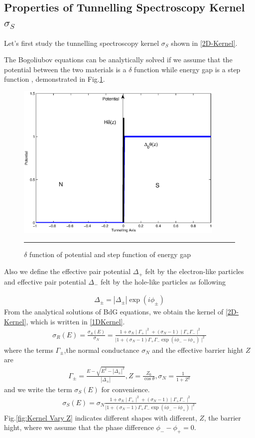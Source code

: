 \subsection{Properties of Tunnelling Spectroscopy Kernel $\sigma_S$}
Let's first study the tunnelling spectroscopy kernel $\sigma_S$ shown in \eqref{2D-Kernel}.

The Bogoliubov equations can be analytically solved if we assume that the potential between the two materials is a $\delta$ function while energy gap is a step function \citep{Reference2}, demonstrated in Fig.\ref{fig:BTK Pair Potential}.
\begin{figure}[htbp]
\small
\centering
\includegraphics[width=10cm]{./Figures/2-2-1.eps}
\rule{35em}{0.5pt}
\caption[An Electron]{$\delta$ function of potential and step function of energy gap}
\label{fig:BTK Pair Potential}
\end{figure}
Also we define the effective pair potential $\Delta_+$ felt by the electron-like particles and effective pair potential $\Delta_-$ felt by the hole-like particles as following

\begin{eqnarray}\label{General Phase Pair}
\Delta_{\pm}=|\Delta_{\pm}|\exp(i\phi_{\pm})
\end{eqnarray}
From the analytical solutions of BdG equations, we obtain the kernel of \eqref{2D-Kernel}, which is written in \eqref{1DKernel}.
\begin{eqnarray}\label{1DKernel}
\sigma_R(E)=\frac{\sigma_S(E)}{\sigma_N}=\frac{1+\sigma_N\mid\Gamma_+\mid^2+(\sigma_N-1)\mid\Gamma_+\Gamma_-\mid^2}{\mid1+(\sigma_N-1)\Gamma_+\Gamma_-\exp(i\phi_--i\phi_+)\mid^2}
\end{eqnarray}
where the terms $\Gamma_{\pm}$,the normal conductance $\sigma_N$ and the effective barrier hight $Z$ are
\begin{eqnarray}
\Gamma_{\pm}=\frac{E-\sqrt{E^2-|\Delta_{\pm}|^2}}{|\Delta_{\pm}|},Z=\frac{Z_0}{\cos\theta},
\sigma_N=\frac{1}{1+Z^2}
\end{eqnarray} 
and we write the term $\sigma_S(E)$ for convenience.
\begin{eqnarray}\label{Tanaka Kernel}
\sigma_S(E)=\sigma_N\frac{1+\sigma_N\mid\Gamma_+\mid^2+(\sigma_N-1)\mid\Gamma_+\Gamma_-\mid^2}{\mid1+(\sigma_N-1)\Gamma_+\Gamma_-\exp(i\phi_--i\phi_+)\mid^2}
\end{eqnarray}
Fig.\ref{fig:Kernel Vary Z} indicates different shapes with different, $Z$, the barrier hight, where we assume that the phase difference $\phi_--\phi_+=0$.

